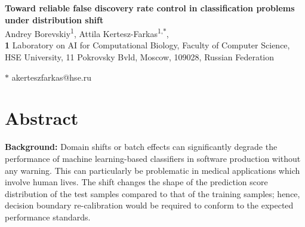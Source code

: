 \documentclass[10pt,letterpaper]{article}
\begin{document}
\vspace*{0.2in}

\begin{flushleft}
{\Large
\textbf{Toward reliable false discovery rate control in classification problems under distribution shift} %
}
\newline
\\
Andrey Borevskiy\textsuperscript{1},
Attila Kertesz-Farkas\textsuperscript{1,$\ast$},
\\
\bigskip
\textbf{1} Laboratory on AI for Computational Biology, Faculty of Computer Science, HSE University, 11 Pokrovsky Bvld, Moscow, 109028, Russian Federation
\\
\bigskip

% 
%

$\ast$ akerteszfarkas@hse.ru

\end{flushleft}


%
\section*{Abstract}

\textbf{Background:} Domain shifts or batch effects can significantly degrade the performance of machine learning-based classifiers in software production without any warning.
This can particularly be problematic in medical applications which involve human lives.
The shift changes the shape of the prediction score distribution of the test samples compared to that of the training samples; hence, decision boundary re-calibration would be required to conform to the expected performance standards. 
\end{document}
